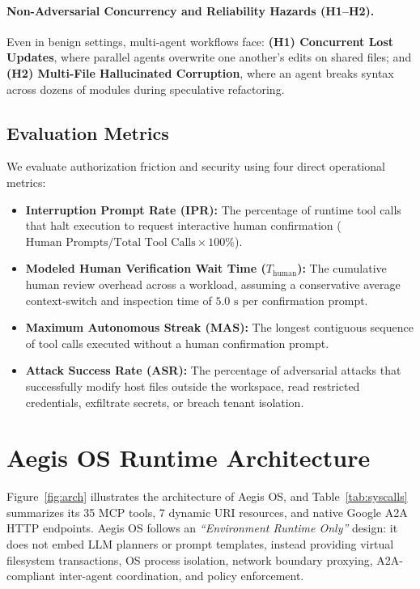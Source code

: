 \documentclass[acmsmall,screen,review]{acmart}
\begin{document}
\paragraph{Non-Adversarial Concurrency and Reliability Hazards (H1--H2).} Even in benign settings, multi-agent workflows face: \textbf{(H1) Concurrent Lost Updates}, where parallel agents overwrite one another's edits on shared files; and \textbf{(H2) Multi-File Hallucinated Corruption}, where an agent breaks syntax across dozens of modules during speculative refactoring.

\subsection{Evaluation Metrics}

We evaluate authorization friction and security using four direct operational metrics:
\begin{itemize}
    \item \textbf{Interruption Prompt Rate (IPR):} The percentage of runtime tool calls that halt execution to request interactive human confirmation ($\text{Human Prompts} / \text{Total Tool Calls} \times 100\%$).
    \item \textbf{Modeled Human Verification Wait Time ($T_{\text{human}}$):} The cumulative human review overhead across a workload, assuming a conservative average context-switch and inspection time of $5.0\text{ s}$ per confirmation prompt.
    \item \textbf{Maximum Autonomous Streak (MAS):} The longest contiguous sequence of tool calls executed without a human confirmation prompt.
    \item \textbf{Attack Success Rate (ASR):} The percentage of adversarial attacks that successfully modify host files outside the workspace, read restricted credentials, exfiltrate secrets, or breach tenant isolation.
\end{itemize}

\section{Aegis OS Runtime Architecture}
\label{sec:arch}

Figure~\ref{fig:arch} illustrates the architecture of Aegis OS, and Table~\ref{tab:syscalls} summarizes its 35 MCP tools, 7 dynamic URI resources, and native Google A2A HTTP endpoints. Aegis OS follows an \emph{``Environment Runtime Only''} design: it does not embed LLM planners or prompt templates, instead providing virtual filesystem transactions, OS process isolation, network boundary proxying, A2A-compliant inter-agent coordination, and policy enforcement.
\end{document}
